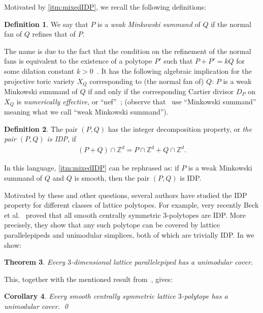 \documentclass{amsart}
\theoremstyle{plain}
\newtheorem{theorem}{Theorem}[section]
\newtheorem{corollary}[theorem]{Corollary}
\theoremstyle{definition}
\newtheorem{definition}[theorem]{Definition}
\newcommand{\Z}{ \ensuremath{\mathbb{Z}}}
\newcommand{\paco}[1]{\todo[size=\tiny,color=green!30]{#1 \\ \hfill --- P.}}
\begin{document}
Motivated by  \eqref{itm:mixedIDP}, we recall the following definitions:

\begin{definition}
We say that $P$ is a \emph{weak Minkowski summand} of $Q$ if the normal fan of $Q$ refines that of $P$.
\end{definition}
The name is due to the fact that the condition on the refinement of the normal fans is equivalent to the existence of a polytope $P'$ such that $P+P' = k Q$ for some dilation constant $k>0$~\cite[??]{Grunbaum}. 
It has the following algebraic implication for the projective toric variety $X_Q$ corresponding to (the normal fan of) $Q$: $P$ is a weak Minkowski summand of $Q$ if and only if the corresponding Cartier divisor $D_P$ on  $X_Q$ is \emph{numerically effective}, or ``nef''~\cite[Cor.~6.2.15, Prop.~6.3.12]{CLS}; (observe that~\cite{CLS} use ``Minkowski summand'' meaning what we call ``weak Minkowski summand''). 
\paco{added this explanation}

\begin{definition}
The pair $(P, Q)$ has the integer decomposition property, or \emph{the pair $(P,Q)$ is IDP}, if 
\begin{align*}
(P+Q) \cap \Z^d = P \cap \Z^d + Q \cap \Z^d.
\end{align*}
\end{definition}
 
In this language,  \eqref{itm:mixedIDP} can be rephrased as: if $P$ is a weak Minkowski summand of $Q$ and $Q$ is smooth, then the pair $(P,Q)$ is IDP.

Motivated by these and other questions, several authors have studied the IDP property for different classes of lattice polytopes. 
%
For example,  very recently
Beck et al.~\cite{BHHHJKM2019} proved that all smooth centrally symmetric $3$-polytopes are IDP.
More precisely, they show that any such polytope can be covered by lattice 
parallelepipeds and unimodular simplices, both of which are trivially IDP.
%
In  we show:

\begin{theorem}
\label{thm:parallelepipeds}
Every $3$-dimensional lattice parallelepiped has a unimodular cover.
\end{theorem}

This, together with the mentioned result from~\cite{BHHHJKM2019}, gives:

\begin{corollary}
\label{coro:3cs}
Every smooth centrally symmetric lattice $3$-polytope has a unimodular cover. 
\qed
\end{corollary}
\end{document}
